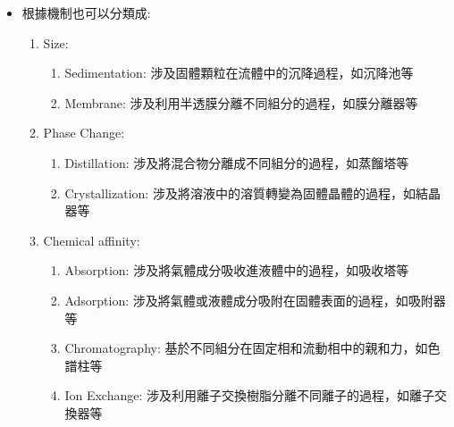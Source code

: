 \documentclass[../main.tex]{subfiles}
\begin{document}
\begin{itemize}
\begin{enumerate}
\begin{enumerate}
    \end{enumerate}
    \item Thermodynamic processes: 涉及能量轉換和熱力學平衡的過程
    \begin{enumerate}
      \item liquefaction: 涉及將氣體轉變為液體的過程，如液化器等
      \item refrigeration: 涉及將熱量從低溫區域轉移到高溫區域的過程，如冷凍機等
    \end{enumerate}
    \item Mechanical processes: 涉及機械運動和力的過程
    \begin{enumerate}
      \item crushing: 涉及將固體物料破碎成較小顆粒的過程，如破碎機等
      \item sieving: 涉及將固體物料根據粒徑分級的過程，如篩分器等
      \item solid transport: 涉及將固體物料從一個位置運輸到另一個位置的過程，如輸送帶等
    \end{enumerate}
  \end{enumerate}
  \item 根據機制也可以分類成:
  \begin{enumerate}
    \item Size:
    \begin{enumerate}
      \item Sedimentation: 涉及固體顆粒在流體中的沉降過程，如沉降池等
      \item Membrane: 涉及利用半透膜分離不同組分的過程，如膜分離器等
    \end{enumerate}
    \item Phase Change:
    \begin{enumerate}
      \item Distillation: 涉及將混合物分離成不同組分的過程，如蒸餾塔等
      \item Crystallization: 涉及將溶液中的溶質轉變為固體晶體的過程，如結晶器等
    \end{enumerate}
    \item Chemical affinity:
    \begin{enumerate}
      \item Absorption: 涉及將氣體成分吸收進液體中的過程，如吸收塔等
      \item Adsorption: 涉及將氣體或液體成分吸附在固體表面的過程，如吸附器等
      \item Chromatography: 基於不同組分在固定相和流動相中的親和力，如色譜柱等
      \item Ion Exchange: 涉及利用離子交換樹脂分離不同離子的過程，如離子交換器等

\end{enumerate}
\end{enumerate}
\end{itemize}
\end{document}
